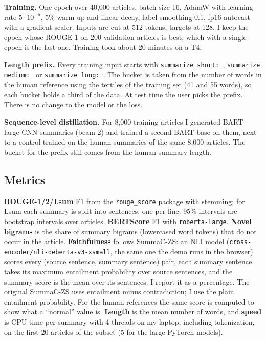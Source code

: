 \documentclass[11pt,a4paper]{article}
\begin{document}
\textbf{Training.} One epoch over 40,000 articles, batch size 16, AdamW with learning rate $5\cdot10^{-5}$,
5\% warm-up and linear decay, label smoothing 0.1, fp16 autocast with a gradient scaler. Inputs are cut at
512 tokens, targets at 128. I keep the epoch whose ROUGE-1 on 200 validation articles is best, which with a
single epoch is the last one. Training took about 20 minutes on a T4.

\textbf{Length prefix.} Every training input starts with \texttt{summarize short: },
\texttt{summarize medium: } or \texttt{summarize long: }. The bucket is taken from the number of words in the
human reference using the tertiles of the training set (41 and 55 words), so each bucket holds a third of the
data. At test time the user picks the prefix. There is no change to the model or the loss.

\textbf{Sequence-level distillation.} For 8,000 training articles I generated BART-large-CNN summaries (beam 2)
and trained a second BART-base on them, next to a control trained on the human summaries of the same 8,000
articles. The bucket for the prefix still comes from the human summary length.

\subsection{Metrics}

\textbf{ROUGE-1/2/Lsum} F1 from the \texttt{rouge\_score} package with stemming; for Lsum each summary is
split into sentences, one per line. 95\% intervals are bootstrap intervals over articles.
\textbf{BERTScore} F1 with \texttt{roberta-large}. \textbf{Novel bigrams} is the share of summary bigrams
(lowercased word tokens) that do not occur in the article. \textbf{Faithfulness} follows SummaC-ZS: an NLI
model (\texttt{cross-encoder/nli-deberta-v3-xsmall}, the same one the demo runs in the browser) scores
every (source sentence, summary sentence) pair, each summary sentence takes its maximum entailment
probability over source sentences, and the summary score is the mean over its sentences. I report it as a
percentage. The original SummaC-ZS uses entailment minus contradiction; I use the plain entailment
probability. For the human references the same score is computed to show what a ``normal'' value is.
\textbf{Length} is the mean number of words, and \textbf{speed} is CPU time per summary with 4 threads on my
laptop, including tokenization, on the first 20 articles of the subset (5 for the large PyTorch models).
\end{document}
